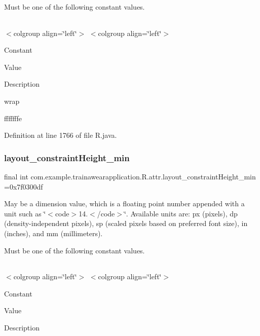 Must be one of the following constant values.

\tabulinesep=1mm
\begin{longtabu}spread 0pt [c]{*{0}{|X[-1]}|}
\hline
\end{longtabu}
$<$colgroup align=\char`\"{}left\char`\"{}$>$ $<$colgroup align=\char`\"{}left\char`\"{}$>$ 

Constant

Value

Description 

wrap

fffffffe

Definition at line 1766 of file R.\+java.

\mbox{\label{classcom_1_1example_1_1trainawearapplication_1_1_r_1_1attr_a2f26a120e3a1ea7b80c756f1e1378da8}} 
\subsubsection{\texorpdfstring{layout\_constraintHeight\_min}{layout\_constraintHeight\_min}}
{\footnotesize\ttfamily final int com.\+example.\+trainawearapplication.\+R.\+attr.\+layout\+\_\+constraint\+Height\+\_\+min =0x7f0300df\hspace{0.3cm}{\ttfamily [static]}}

May be a dimension value, which is a floating point number appended with a unit such as \char`\"{}$<$code$>$14.\+5sp$<$/code$>$\char`\"{}. Available units are\+: px (pixels), dp (density-\/independent pixels), sp (scaled pixels based on preferred font size), in (inches), and mm (millimeters). 

Must be one of the following constant values.

\tabulinesep=1mm
\begin{longtabu}spread 0pt [c]{*{0}{|X[-1]}|}
\hline
\end{longtabu}
$<$colgroup align=\char`\"{}left\char`\"{}$>$ $<$colgroup align=\char`\"{}left\char`\"{}$>$ 

Constant

Value

Description 

